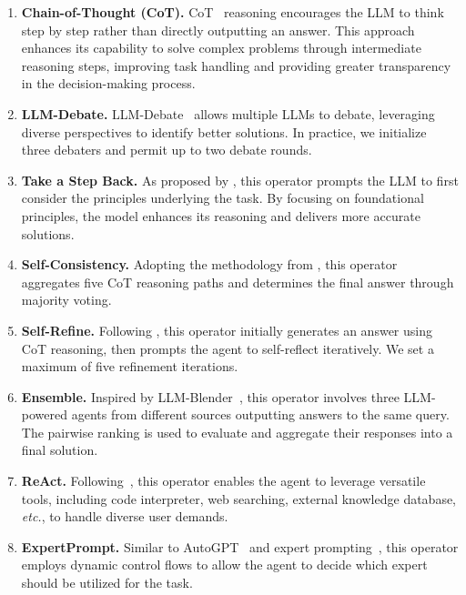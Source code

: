 \documentclass{article}
\theoremstyle{plain}
\theoremstyle{definition}
\theoremstyle{remark}
\begin{document}
\begin{enumerate}
    \item \textbf{Chain-of-Thought (CoT).}  
    CoT~\citep{cot} reasoning encourages the LLM to think step by step rather than directly outputting an answer. This approach enhances its capability to solve complex problems through intermediate reasoning steps, improving task handling and providing greater transparency in the decision-making process.

    \item \textbf{LLM-Debate.}  
    LLM-Debate~\citep{arXiv2023_MultiAgent-Debate} allows multiple LLMs to debate, leveraging diverse perspectives to identify better solutions. In practice, we initialize three debaters and permit up to two debate rounds.

    \item \textbf{Take a Step Back.}  
    As proposed by \citet{zheng2023take-a-step-back}, this operator prompts the LLM to first consider the principles underlying the task. By focusing on foundational principles, the model enhances its reasoning and delivers more accurate solutions.

    \item \textbf{Self-Consistency.}  
    Adopting the methodology from \citet{wang2023selfconsistency}, this operator aggregates five CoT reasoning paths and determines the final answer through majority voting.

    \item \textbf{Self-Refine.}  
    Following \citet{NeurIPS2023_Self-Refine}, this operator initially generates an answer using CoT reasoning, then prompts the agent to self-reflect iteratively. We set a maximum of five refinement iterations.

    \item \textbf{Ensemble.}  
    Inspired by LLM-Blender~\citep{blender}, this operator involves three LLM-powered agents from different sources outputting answers to the same query. The pairwise ranking is used to evaluate and aggregate their responses into a final solution.

    \item \textbf{ReAct.} Following~\citep{yao2023react}, this operator enables the agent to leverage versatile tools, including code interpreter, web searching, external knowledge database, \textit{etc.}, to handle diverse user demands. 

    \item \textbf{ExpertPrompt.}  
    Similar to AutoGPT~\citep{autogpt} and expert prompting~\citep{xu2023expertprompting}, this operator employs dynamic control flows to allow the agent to decide which expert should be utilized for the task.
\end{enumerate}
\end{document}
